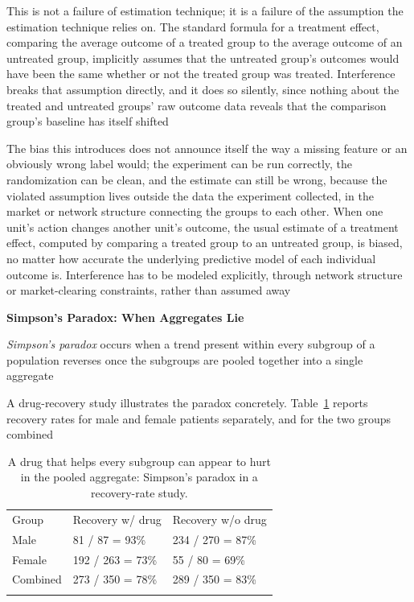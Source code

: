 This is not a failure of estimation technique; it is a failure of the assumption
the estimation technique relies on. The standard formula for a treatment effect,
comparing the average outcome of a treated group to the average outcome of an
untreated group, implicitly assumes that the untreated group's outcomes would have
been the same whether or not the treated group was treated. Interference breaks
that assumption directly, and it does so silently, since nothing about the
treated and untreated groups' raw outcome data reveals that the comparison group's
baseline has itself shifted

The bias this introduces does not announce itself the way a missing feature or
an obviously wrong label would; the experiment can be run correctly, the
randomization can be clean, and the estimate can still be wrong, because the
violated assumption lives outside the data the experiment collected, in the market
or network structure connecting the groups to each other. When one unit's action
changes another unit's outcome, the usual estimate of a treatment effect,
computed by comparing a treated group to an untreated group, is biased, no
matter how accurate the underlying predictive model of each individual outcome
is. Interference has to be modeled explicitly, through network structure or
market-clearing constraints, rather than assumed away

\textbf{Simpson's Paradox: When Aggregates Lie}

\begin{definition}
  \emph{Simpson's paradox} occurs when a trend present within every subgroup of
  a population reverses once the subgroups are pooled together into a single
  aggregate
\end{definition}

A drug-recovery study illustrates the paradox concretely. Table~\ref{tab:simpsons-paradox}
reports recovery rates for male and female patients separately, and for the two groups
combined

\begin{table}[!t]
  \caption{A drug that helps every subgroup can appear to hurt in the pooled
  aggregate: Simpson's paradox in a recovery-rate study.}
  \label{tab:simpsons-paradox}
  \begin{tabular}{p{2.4cm}p{4.6cm}p{4.6cm}}
    \hline
    \noalign{\smallskip} Group                            & Recovery w/ drug & Recovery w/o drug \\
    \noalign{\smallskip}\svhline\noalign{\smallskip} Male & 81 / 87 = 93\%   & 234 / 270 = 87\%  \\
    Female                                                & 192 / 263 = 73\% & 55 / 80 = 69\%    \\
    Combined                                              & 273 / 350 = 78\% & 289 / 350 = 83\%  \\
    \noalign{\smallskip}                                   \hline
    \noalign{\smallskip}
  \end{tabular}
\end{table}

